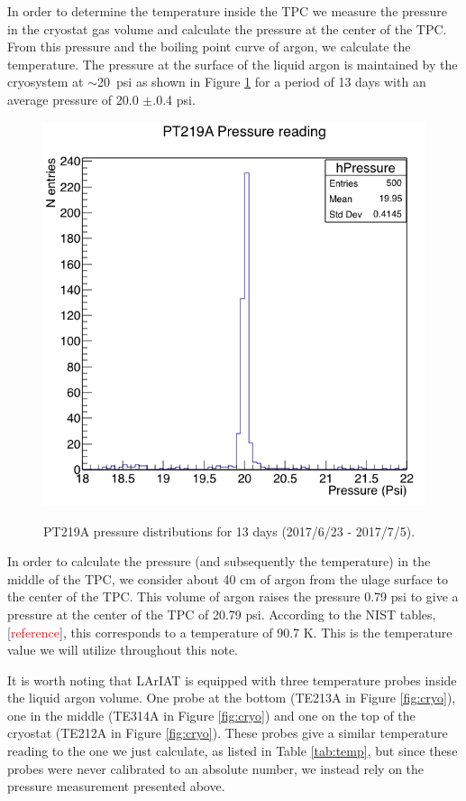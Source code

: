 In order to determine the temperature inside the TPC we measure the pressure in the cryostat gas volume and calculate the pressure at the center of the TPC. From this pressure and the boiling point curve of argon, we calculate the temperature. The pressure at the surface of the liquid argon is maintained by the cryosystem at $\sim$20~psi as shown in Figure \ref{fig:pressure} for a period of 13 days with an average pressure of 20.0 $\pm$.0.4 psi.

\begin{figure}[htb]
\centering
\includegraphics[scale=0.45]{./images/Pressure.png}\\
\caption{PT219A pressure distributions for 13 days (2017/6/23 - 2017/7/5).}
\label{fig:pressure}
\end{figure}

In order to calculate the pressure (and subsequently the temperature) in the middle of the TPC, we consider about 40 cm of argon from the ulage surface to the center of the TPC. This volume of argon raises the pressure 0.79 psi to give a pressure at the center of the TPC of 20.79 psi. According to the NIST tables, [\textcolor{red}{reference}], this corresponds to a temperature of 90.7 K. This is the temperature value we will utilize throughout this note.

It is worth noting that LArIAT is equipped with three temperature probes inside the liquid argon volume. One probe at the bottom (TE213A in Figure \ref{fig:cryo}), one in the middle (TE314A in Figure \ref{fig:cryo}) and one on the top of the cryostat (TE212A in Figure \ref{fig:cryo}). These probes give a similar temperature reading to the one we just calculate, as listed in Table \ref{tab:temp}, but since these probes were never calibrated to an absolute number, we instead rely on the pressure measurement presented above.

